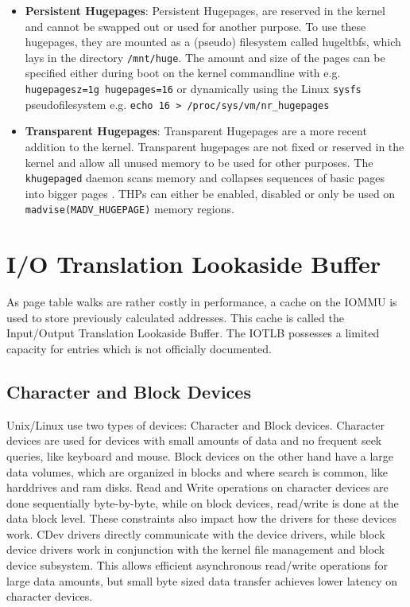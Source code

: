\begin{itemize}
    \item \textbf{Persistent Hugepages}: Persistent Hugepages, are reserved in the kernel and cannot be swapped out or used for another purpose. To use these hugepages, they are mounted as a (pseudo) filesystem called hugeltbfs, which lays in the directory \texttt{/mnt/huge}. \cite{hugetlbkerneldocs} The amount and size of the pages can be specified either during boot on the kernel commandline with e.g. \texttt{hugepagesz=1g hugepages=16} or dynamically using the Linux \texttt{sysfs} pseudofilesystem e.g. \texttt{echo 16 > /proc/sys/vm/nr\_hugepages}
    \item \textbf{Transparent Hugepages}: Transparent Hugepages are a more recent addition to the kernel. Transparent hugepages are not fixed or reserved in the kernel and allow all unused memory to be used for other purposes. The \texttt{khugepaged} daemon scans memory and collapses sequences of basic pages into bigger pages \cite{transhugekerneldocs}. THPs can either be enabled, disabled or only be used on \texttt{madvise(MADV\_HUGEPAGE)} memory regions.
\end{itemize}

\section{I/O Translation Lookaside Buffer}
As page table walks are rather costly in performance, a cache on the IOMMU is used to store previously calculated addresses. This cache is called the Input/Output Translation Lookaside Buffer. The IOTLB possesses a limited capacity for entries which is not officially documented.

\subsection{Character and Block Devices}
Unix/Linux use two types of devices: Character and Block devices. Character devices are used for devices with small amounts of data and no frequent seek queries, like keyboard and mouse. Block devices on the other hand have a large data volumes, which are organized in blocks and where search is common, like harddrives and ram disks.
Read and Write operations on character devices are done sequentially byte-by-byte, while on block devices, read/write is done at the data block level.
These constraints also impact how the drivers for these devices work. CDev drivers directly communicate with the device drivers, while block device drivers work in conjunction with the kernel file management and block device subsystem. This allows efficient asynchronous read/write operations for large data amounts, but small byte sized data transfer achieves lower latency on character devices.

